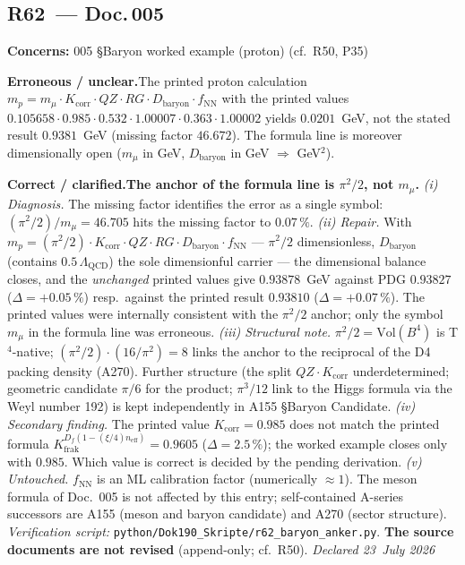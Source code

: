 \medskip


\subsection*{R62~--- Doc.\,005}

\noindent\textbf{Concerns:} 005 \S{}Baryon worked example (proton) (cf.\ R50, P35)


\smallskip\noindent\textbf{Erroneous / unclear.}\quad The printed proton calculation
   $m_p = m_\mu \cdot K_\text{corr} \cdot QZ \cdot RG \cdot D_\text{baryon} \cdot f_\text{NN}$
   with the printed values $0.105658 \cdot 0.985 \cdot 0.532 \cdot 1.00007 \cdot 0.363 \cdot 1.00002$
   yields $0.0201$~GeV, not the stated result $0.9381$~GeV
   (missing factor $46.672$). The formula line is moreover dimensionally
   open ($m_\mu$ in GeV, $D_\text{baryon}$ in GeV $\Rightarrow$ GeV$^2$).


\smallskip\noindent\textbf{Correct / clarified.}\quad \textbf{The anchor of the formula line is $\pi^2/2$, not $m_\mu$.}
   \emph{(i) Diagnosis.} The missing factor identifies the error as a
   single symbol: $(\pi^2/2)/m_\mu = 46.705$ hits the missing factor to
   $0.07\,\%$. \emph{(ii) Repair.} With
   $m_p = (\pi^2/2)\cdot K_\text{corr}\cdot QZ\cdot RG\cdot
   D_\text{baryon}\cdot f_\text{NN}$ --- $\pi^2/2$ dimensionless,
   $D_\text{baryon}$ (contains $0.5\,\Lambda_\text{QCD}$) the sole
   dimensionful carrier --- the dimensional balance closes, and the
   \emph{unchanged} printed values give $0.93878$~GeV against PDG
   $0.93827$ ($\Delta = +0.05\,\%$) resp.\ against the printed result
   $0.93810$ ($\Delta = +0.07\,\%$). The printed values were internally
   consistent with the $\pi^2/2$ anchor; only the symbol $m_\mu$ in the
   formula line was erroneous. \emph{(iii) Structural note.}
   $\pi^2/2 = \text{Vol}(B^4)$ is T$^4$-native;
   $(\pi^2/2)\cdot(16/\pi^2) = 8$ links the anchor to the reciprocal of
   the D4 packing density (A270). Further structure (the split
   $QZ\cdot K_\text{corr}$ underdetermined; geometric candidate $\pi/6$
   for the product; $\pi^3/12$ link to the Higgs formula via the Weyl
   number 192) is kept independently in A155 \S{}Baryon Candidate.
   \emph{(iv) Secondary finding.} The printed value
   $K_\text{corr} = 0.985$ does not match the printed formula
   $K_\text{frak}^{D_f(1-(\xi/4)n_\text{eff})} = 0.9605$
   ($\Delta = 2.5\,\%$); the worked example closes only with $0.985$.
   Which value is correct is decided by the pending derivation.
   \emph{(v) Untouched.} $f_\text{NN}$ is an ML calibration factor
   (numerically $\approx 1$). The meson formula of Doc.~005 is not
   affected by this entry; self-contained A-series successors are A155
   (meson and baryon candidate) and A270 (sector structure).
   \emph{Verification script:} \texttt{python/Dok190\_Skripte/r62\_baryon\_anker.py}.
   \textbf{The source documents are not revised}
   (append-only; cf.\ R50). \emph{Declared 23~July 2026}



